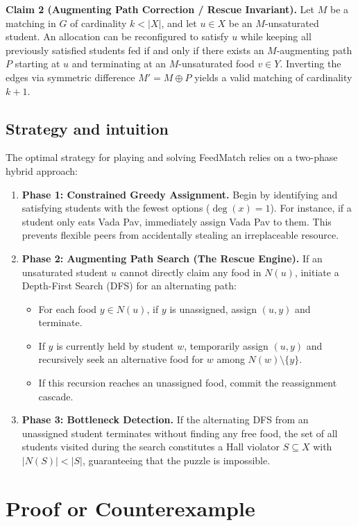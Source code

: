 \documentclass[11pt,a4paper]{article}
\begin{document}
\textbf{Claim 2 (Augmenting Path Correction / Rescue Invariant).} Let $M$ be a matching in $G$ of cardinality $k < |X|$, and let $u \in X$ be an $M$-unsaturated student. An allocation can be reconfigured to satisfy $u$ while keeping all previously satisfied students fed if and only if there exists an $M$-augmenting path $P$ starting at $u$ and terminating at an $M$-unsaturated food $v \in Y$. Inverting the edges via symmetric difference $M' = M \oplus P$ yields a valid matching of cardinality $k+1$.

\subsection{Strategy and intuition}
The optimal strategy for playing and solving FeedMatch relies on a two-phase hybrid approach:

\begin{enumerate}
  \item \textbf{Phase 1: Constrained Greedy Assignment.} Begin by identifying and satisfying students with the fewest options ($\deg(x) = 1$). For instance, if a student only eats Vada Pav, immediately assign Vada Pav to them. This prevents flexible peers from accidentally stealing an irreplaceable resource.
  \item \textbf{Phase 2: Augmenting Path Search (The Rescue Engine).} If an unsaturated student $u$ cannot directly claim any food in $N(u)$, initiate a Depth-First Search (DFS) for an alternating path:
  \begin{itemize}
    \item For each food $y \in N(u)$, if $y$ is unassigned, assign $(u, y)$ and terminate.
    \item If $y$ is currently held by student $w$, temporarily assign $(u, y)$ and recursively seek an alternative food for $w$ among $N(w) \setminus \{y\}$.
    \item If this recursion reaches an unassigned food, commit the reassignment cascade.
  \end{itemize}
  \item \textbf{Phase 3: Bottleneck Detection.} If the alternating DFS from an unassigned student terminates without finding any free food, the set of all students visited during the search constitutes a Hall violator $S \subseteq X$ with $|N(S)| < |S|$, guaranteeing that the puzzle is impossible.
\end{enumerate}

\newpage
\section{Proof or Counterexample}
\end{document}
